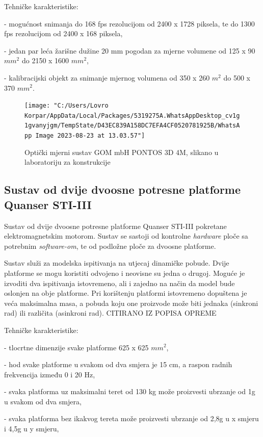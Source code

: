 \documentclass[12pt]{book}
\begin{document}
Tehničke karakteristike:

- mogućnost snimanja do 168 fps rezolucijom od 2400 x 1728 piksela, te do 1300 fps rezolucijom od 2400 x 168 piksela,

- jedan par leća žarišne dužine 20 mm pogodan za mjerne volumene od 125 x 90 $mm^2$ do 2150 x 1600 $mm^2$,

- kalibracijski objekt za snimanje mjernog volumena od 350 x 260 $m^2$ do 500 x 370 $mm^2$.

\begin{figure}[h]
	\centering
	\texttt{[image: "C:/Users/Lovro Korpar/AppData/Local/Packages/5319275A.WhatsAppDesktop\_cv1g1gvanyjgm/TempState/D43EC839A158DC7EFA4CF0520781925B/WhatsApp Image 2023-08-23 at 13.03.57"]}
	\caption{Optički mjerni sustav GOM mbH PONTOS 3D 4M, slikano u laboratoriju za konstrukcije}
	\label{fig:whatsapp-image-2023-08-23-at-13}
\end{figure}

\newpage

\subsection{Sustav od dvije dvoosne potresne platforme Quanser STI-III}

Sustav od dvije dvoosne potresne platforme Quanser STI-III pokretane elektromagnetskim motorom. Sustav se sastoji od kontrolne \textit{hardware} ploče sa potrebnim \textit{software-om}, te od podložne ploče za dvoosne platforme.

Sustav služi za modelska ispitivanja na utjecaj dinamičke pobude. Dvije platforme se mogu koristiti odvojeno i neovisne su jedna o drugoj. Moguće je izvoditi dva ispitivanja istovremeno, ali i zajedno na način da model bude oslonjen na obje platforme. Pri korištenju platformi istovremeno dopuštena je veća maksimalna masa, a pobuda koju one proizvode može biti jednaka (sinkroni rad) ili različita (asinkroni rad). CITIRANO IZ POPISA OPREME

\newpage

Tehničke karakteristike:

- tlocrtne dimenzije svake platforme 625 x 625 $mm^2$,

- hod svake platforme u svakom od dva smjera je 15 cm, a raspon radnih frekvencija između 0 i 20 Hz,

- svaka platforma uz maksimalni teret od 130 kg može proizvesti ubrzanje od 1g u svakom od dva smjera,

- svaka platforma bez ikakvog tereta može proizvesti ubrzanje od 2,8g u x smjeru i 4,5g u y smjeru,
\end{document}
